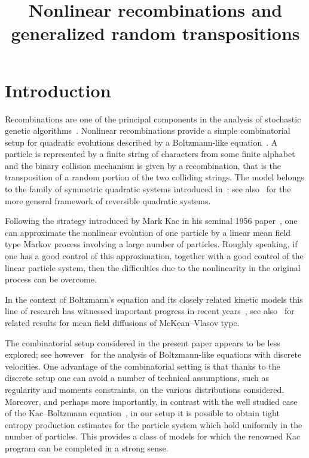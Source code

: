 \documentclass[AHL,Unicode,longabstracts,published]{cedram}
\title[Nonlinear recombinations and generalized random transpositions]{Nonlinear recombinations and generalized random transpositions}
\author[\initial{P.} \lastname{Caputo}]{\firstname{Pietro} \lastname{Caputo}}
\author[\initial{D.} \lastname{Parisi}]{\firstname{Daniel} \lastname{Parisi}}
\begin{document}
\maketitle

\section{Introduction}\label{sec:1}
Recombinations are one of the principal components in the analysis of stochastic genetic algorithms~\cite{Lyubich,Nagylaki}. Nonlinear recombinations provide a simple combinatorial setup for quadratic evolutions described by a Boltzmann-like equation~\cite{Sinetal2}. A particle is represented by a finite string of characters from some finite alphabet and the binary collision mechanism is given by a recombination, that is the transposition of a random portion of the two colliding strings. The model belongs to the family of symmetric quadratic systems introduced in~\cite{Sinetal}; see also~\cite{entprod} for the more general framework of reversible quadratic systems.

Following the strategy introduced by Mark Kac in his seminal 1956 paper~\cite{KAC}, one can approximate the nonlinear evolution of one particle by a linear mean field type Markov process involving a large number of particles. Roughly speaking, if one has a good control of this approximation, together with a good control of the linear particle system, then the difficulties due to the nonlinearity in the original process can be overcome.


In the context of Boltzmann's equation and its closely related kinetic models this line of research has witnessed important progress in recent years~\cite{entfound,revchaos,kacsprog,anewapp}, see also~\cite{cattiaux,elementary,lacker} for related results for mean field diffusions of McKean--Vlasov type.

The combinatorial setup considered in the present paper appears to be less explored; see however~\cite{Bertini_etal,review_discrete,Reza} for the analysis of Boltzmann-like equations with discrete velocities. One advantage of the combinatorial setting is that thanks to the discrete setup one can avoid a number of technical assumptions, such as regularity and moments constraints, on the various distributions considered. Moreover, and perhaps more importantly, in contrast with the well studied case of the Kac--Boltzmann equation~\cite{bonetto2017entropy,entfound,
einav2011villani,kacsprog}, in our setup it is possible to obtain tight entropy production estimates for the particle system which hold uniformly in the number of particles. This provides a class of models for which the renowned Kac program can be completed in a strong sense.
\end{document}

